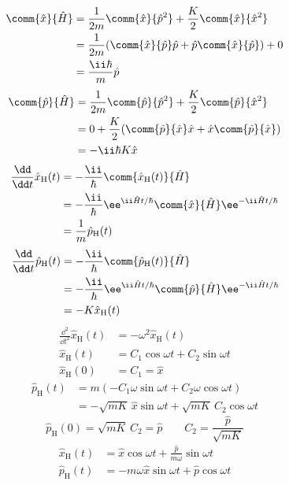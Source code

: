 \begin{align*}
\comm{\hat{x}}{\hat{H}}&=\frac{1}{2m}\comm{\hat{x}}{\hat{p}^{2}}+\frac{K}{2}\comm{\hat{x}}{\hat{x}^{2}}\\
&=\frac{1}{2m}(\comm{\hat{x}}{\hat{p}}\hat{p}+\hat{p}\comm{\hat{x}}{\hat{p}})+0\\
&=\frac{\ii\hbar}{m}\hat{p}
\end{align*}
\begin{align*}
\comm{\hat{p}}{\hat{H}}&=\frac{1}{2m}\comm{\hat{p}}{\hat{p}^{2}}+\frac{K}{2}\comm{\hat{p}}{\hat{x}^{2}}\\
&=0+\frac{K}{2}(\comm{\hat{p}}{\hat{x}}\hat{x}+\hat{x}\comm{\hat{p}}{\hat{x}})\\
&=-\ii\hbar K\hat{x}
\end{align*}
\begin{align*}
\frac{\dd}{\dd t}\hat{x}_{\mathrm{H}}(t)&=-\frac{\ii}{\hbar}\comm{\hat{x}_{\mathrm{H}}(t)}{\hat{H}}\\
&=-\frac{\ii}{\hbar}\ee^{\ii\hat{H}t/\hbar}\comm{\hat{x}}{\hat{H}}\ee^{-\ii\hat{H}t/\hbar}\\
&=\frac{1}{m}\hat{p}_{\mathrm{H}}(t)
\end{align*}
\begin{align*}
\frac{\dd}{\dd t}\hat{p}_{\mathrm{H}}(t)&=-\frac{\ii}{\hbar}\comm{\hat{p}_{\mathrm{H}}(t)}{\hat{H}}\\
&=-\frac{\ii}{\hbar}\ee^{\ii\hat{H}t/\hbar}\comm{\hat{p}}{\hat{H}}\ee^{-\ii\hat{H}t/\hbar}\\
&=-K\hat{x}_{\mathrm{H}}(t)
\end{align*}
\begin{align*}
\frac{\dd^{2}}{\dd t^{2}}\hat{x}_{\mathrm{H}}(t)&=-\omega^{2}\hat{x}_{\mathrm{H}}(t)\\
\hat{x}_{\mathrm{H}}(t)&=C_{1}\cos\omega t+C_{2}\sin\omega t\\
\hat{x}_{\mathrm{H}}(0)&=C_{1}=\hat{x}
\end{align*}
\begin{align*}
\hat{p}_{\mathrm{H}}(t)&=m(-C_{1}\omega\sin\omega t+C_{2}\omega\cos\omega t)\\
&=-\sqrt{mK}\,\hat{x}\sin\omega t+\sqrt{mK}\,C_{2}\cos\omega t
\end{align*}
\[ \hat{p}_{\mathrm{H}}(0)=\sqrt{mK}\,C_{2}=\hat{p}\qquad C_{2}=\frac{\hat{p}}{\sqrt{mK}} \]
\begin{align*}
\hat{x}_{\mathrm{H}}(t)&=\hat{x}\cos\omega t+\frac{\hat{p}}{m\omega}\sin\omega t\\
\hat{p}_{\mathrm{H}}(t)&=-m\omega\hat{x}\sin\omega t+\hat{p}\cos\omega t
\end{align*}

